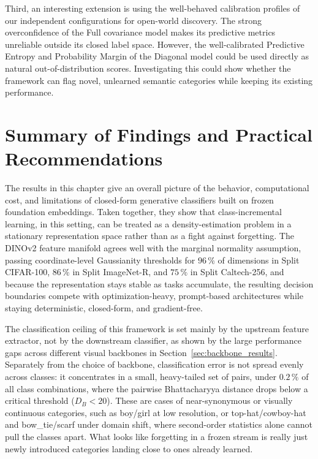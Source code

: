 Third, an interesting extension is using the well-behaved calibration profiles of our independent configurations for open-world discovery. The strong overconfidence of the Full covariance model makes its predictive metrics unreliable outside its closed label space. However, the well-calibrated Predictive Entropy and Probability Margin of the Diagonal model could be used directly as natural out-of-distribution scores. Investigating this could show whether the framework can flag novel, unlearned semantic categories while keeping its existing performance.

\section{Summary of Findings and Practical Recommendations}
\label{sec:an:summary}

The results in this chapter give an overall picture of the behavior, computational cost, and limitations of closed-form generative classifiers built on frozen foundation embeddings. Taken together, they show that class-incremental learning, in this setting, can be treated as a density-estimation problem in a stationary representation space rather than as a fight against forgetting. The DINOv2 feature manifold agrees well with the marginal normality assumption, passing coordinate-level Gaussianity thresholds for $96\,\%$ of dimensions in Split CIFAR-100, $86\,\%$ in Split ImageNet-R, and $75\,\%$ in Split Caltech-256, and because the representation stays stable as tasks accumulate, the resulting decision boundaries compete with optimization-heavy, prompt-based architectures while staying deterministic, closed-form, and gradient-free.

The classification ceiling of this framework is set mainly by the upstream feature extractor, not by the downstream classifier, as shown by the large performance gaps across different visual backbones in Section~\ref{sec:backbone_results}. Separately from the choice of backbone, classification error is not spread evenly across classes: it concentrates in a small, heavy-tailed set of pairs, under $0.2\,\%$ of all class combinations, where the pairwise Bhattacharyya distance drops below a critical threshold ($D_B < 20$). These are cases of near-synonymous or visually continuous categories, such as boy/girl at low resolution, or top-hat/cowboy-hat and bow\_tie/scarf under domain shift, where second-order statistics alone cannot pull the classes apart. What looks like forgetting in a frozen stream is really just newly introduced categories landing close to ones already learned.

